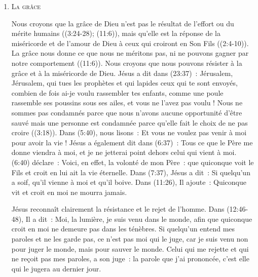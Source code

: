 \begin{enumerate}
  \item  \textsc{La grâce}

\nobreak
\begin{specialpar}{}
Nous croyons que la grâce de Dieu n'est pas le résultat de l'effort
 ou du mérite humains
 ((3:24-28); (11:6)),
 mais qu'elle est la réponse
 de la miséricorde et de l'amour de Dieu à ceux qui croiront en Son Fils
 ((2:4-10)).
 La grâce nous donne 
 ce que nous ne méritons pas, ni ne pouvons gagner par notre comportement
 ((11:6)).
 Nous croyons que nous pouvons résister à la grâce et à la miséricorde de Dieu.
 Jésus a dit dans (23:37)~:
 \og Jérusalem, Jérusalem, qui tues les prophètes et qui lapides ceux
 qui te sont envoyés, combien de fois ai-je voulu rassembler tes enfants,
 comme une poule rassemble ses poussins sous ses ailes, et vous ne l'avez pas voulu ! \fg{}
 Nous ne sommes pas condamnés parce que nous n'avons aucune opportunité d'être sauvé
 mais une personne est condamnée parce qu'elle fait le choix de ne pas croire
 ((3:18)).
 Dans (5:40), nous lisons~:
 \og Et vous ne voulez pas venir à moi pour avoir la vie ! \fg{}
 Jésus a également dit dans (6:37)~:
 \og Tous ce que le Père me donne viendra à moi,
 et je ne jetterai point dehors celui qui vient à moi. \fg{}
 (6:40) déclare~:
 \og Voici, en effet, la volonté de mon Père~: que quiconque voit le Fils
 et croit en lui ait la vie éternelle. \fg{}
 Dans (7:37), Jésus a dit~:
 \og Si quelqu'un a soif, qu'il vienne à moi et qu'il boive. \fg{}
 Dans (11:26), Il ajoute~:
 \og Quiconque vit et croit en moi ne mourra jamais. \fg{}
\end{specialpar}

Jésus reconnaît clairement la résistance et le rejet de l'hom\-me.
 Dans (12:46-48), Il a dit~:
 \og Moi, la lumière, je suis venu dans le monde, afin que quiconque croit
 en moi ne demeure pas dans les ténèbres. Si quelqu'un entend mes paroles
 et ne les garde pas, ce n'est pas moi qui le juge, car je suis venu non
 pour juger le monde, mais pour sauver le monde. Celui qui me rejette et qui
 ne reçoit pas mes paroles, a son juge~: la parole que j'ai prononcée,
 c'est elle qui le jugera au dernier jour. \fg{}


\end{enumerate}
